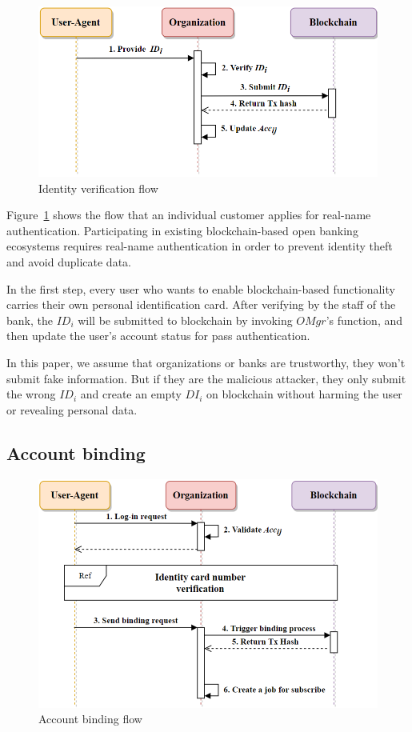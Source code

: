     \begin{figure}[htb]
        \centering
        \includegraphics[height=!,width=0.8\linewidth,keepaspectratio=true]{figures/identity_verification.png}
        \caption{{\footnotesize Identity verification flow}}
        \label{fig:identityVerification}
    \end{figure}
    Figure~\ref{fig:identityVerification} shows the flow that an individual customer applies for real-name authentication. Participating in existing blockchain-based open banking ecosystems requires real-name authentication in order to prevent identity theft and avoid duplicate data. \par
    In the first step, every user who wants to enable blockchain-based functionality carries their own personal identification card. After verifying by the staff of the bank, the \(ID_i\) will be submitted to blockchain by invoking \(OMgr\)'s function, and then update the user's account status for pass authentication.\par
    In this paper, we assume that organizations or banks are trustworthy, they won't submit fake information. But if they are the malicious attacker, they only submit the wrong \(ID_i\) and create an empty \(DI_i\) on blockchain without harming the user or revealing personal data.

    \newpage
    \subsection{Account binding}
    \begin{figure}[htb]
        \centering
        \includegraphics[height=!,width=0.8\linewidth,keepaspectratio=true]{figures/account_binding.png}
        \caption{{\footnotesize Account binding flow}}
        \label{fig:accountBinding}
    \end{figure}

